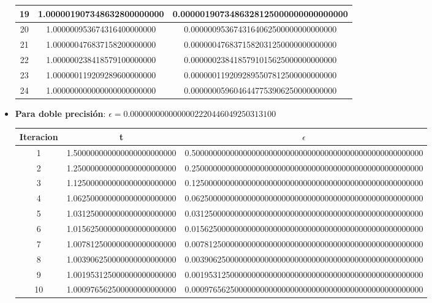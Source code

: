 \documentclass{article}
\begin{document}
\begin{itemize}
\begin{longtable}{|c||c|c|}
		19 & 1.000001907348632800000000 & 0.0000019073486328125000000000000000 \\  \hline
		20 & 1.000000953674316400000000 & 0.0000009536743164062500000000000000 \\  \hline
		21 & 1.000000476837158200000000 & 0.0000004768371582031250000000000000 \\  \hline
		22 & 1.000000238418579100000000 & 0.0000002384185791015625000000000000 \\  \hline
		23 & 1.000000119209289600000000 & 0.0000001192092895507812500000000000 \\  \hline
		24 & 1.000000000000000000000000 & 0.0000000596046447753906250000000000 \\  \hline
	\end{longtable}
	
	\vspace{0.2cm}
	\item \textbf{Para doble precisión}:
	$\epsilon =  0.0000000000000002220446049250313100$ \newline
	\begin{longtable}{|c||c|c|}
		\hline
		Iteracion & t & $\epsilon$ \\ \hline \hline
		1 & 1.500000000000000000000000 & 0.500000000000000000000000000000000000000000000000000000 \\ \hline 
		2 & 1.250000000000000000000000 & 0.250000000000000000000000000000000000000000000000000000 \\ \hline 
		3 & 1.125000000000000000000000 & 0.125000000000000000000000000000000000000000000000000000 \\ \hline 
		4 & 1.062500000000000000000000 & 0.062500000000000000000000000000000000000000000000000000 \\ \hline 
		5 & 1.031250000000000000000000 & 0.031250000000000000000000000000000000000000000000000000 \\ \hline 
		6 & 1.015625000000000000000000 & 0.015625000000000000000000000000000000000000000000000000 \\ \hline 
		7 & 1.007812500000000000000000 & 0.007812500000000000000000000000000000000000000000000000 \\ \hline 
		8 & 1.003906250000000000000000 & 0.003906250000000000000000000000000000000000000000000000 \\ \hline 
		9 & 1.001953125000000000000000 & 0.001953125000000000000000000000000000000000000000000000 \\ \hline 
		10 & 1.000976562500000000000000 & 0.000976562500000000000000000000000000000000000000000000 \\ \hline 

\end{longtable}
\end{itemize}
\end{document}
